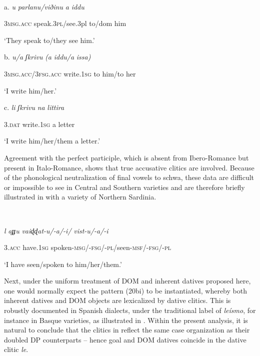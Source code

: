 \documentclass[output=paper]{langscibook}
\begin{document}
\ea\label{ex:key:}
{}\\
\z

a.  \textit{u}    \textit{parlanu/viðinu}   \textit{a}   \textit{iddu}

  \textsc{3msg.acc}  speak.\textsc{3pl}/see.3pl   to/dom him

‘They speak to/they see him.’        

  b.  \textit{u/a}       \textit{ʃkrivu}     \textit{(a} \textit{iddu/a} \textit{issa)}  

  \textsc{3msg.acc/3fsg.acc} write.\textsc{1sg}   to him/to her

‘I write him/her.’  

  c.  \textit{li}   \textit{ʃkrivu}     \textit{na} \textit{littira}        

\textsc{3.dat}   write.\textsc{1sg}   a letter   

‘I write him/her/them a letter.’           

Agreement with the perfect participle, which is absent from Ibero-Romance but present in Italo-Romance, shows that true accusative clitics are involved. Because of the phonological neutralization of final vowels to schwa, these data are difficult or impossible to see in Central and Southern varieties and are therefore briefly illustrated in  with a variety of Northern Sardinia.  

\ea\label{ex:key:}
{} \\
\z

\textit{l}    \textit{aɟɟu}     \textit{vaiɖɖat-u/-a/-i/}    \textit{vist-u/-a/-i}

   \textsc{3.acc}  have.\textsc{1sg}   spoken-\textsc{msg/-fsg/-pl/}seen-\textsc{msf/-fsg/-pl}  

‘I have seen/spoken to him/her/them.’        

Next, under the uniform treatment of DOM and inherent datives proposed here, one would normally expect the pattern (20bi) to be instantiated, whereby both inherent datives and DOM objects are lexicalized by dative clitics. This is robustly documented in Spanish dialects, under the traditional label of \textit{leísmo}, for instance in Basque varieties, as illustrated in .  Within the present analysis, it is natural to conclude that the clitics in  reflect the same case organization as their doubled DP counterparts – hence goal and DOM datives coincide in the dative clitic \textit{le}. 
\end{document}
